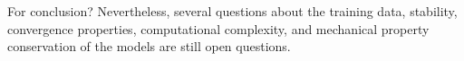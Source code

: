 For conclusion? 
Nevertheless, several questions about the training data, stability, convergence properties, computational complexity, and mechanical property conservation of the models are still open questions. 